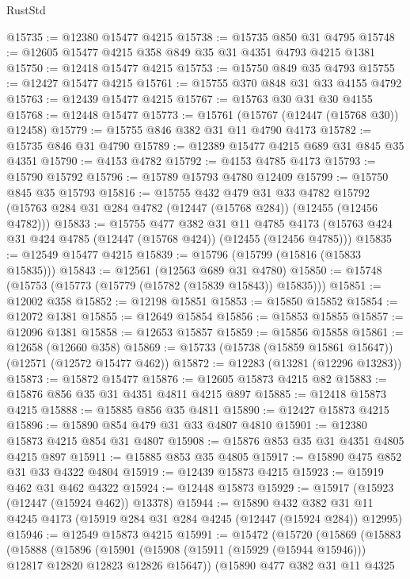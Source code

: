 \begin{lexlean}{RustStd}
\begin{coremodule}
@15735 := @12380 @15477 @4215
@15738 := @15735 @850 @31 @4795
@15748 := @12605 @15477 @4215 @358 @849 @35 @31 @4351 @4793 @4215 @1381
@15750 := @12418 @15477 @4215
@15753 := @15750 @849 @35 @4793
@15755 := @12427 @15477 @4215
@15761 := @15755 @370 @848 @31 @33 @4155 @4792
@15763 := @12439 @15477 @4215
@15767 := @15763 @30 @31 @30 @4155
@15768 := @12448 @15477
@15773 := @15761 (@15767 (@12447 (@15768 @30)) @12458)
@15779 := @15755 @846 @382 @31 @11 @4790 @4173
@15782 := @15735 @846 @31 @4790
@15789 := @12389 @15477 @4215 @689 @31 @845 @35 @4351
@15790 := @4153 @4782
@15792 := @4153 @4785 @4173
@15793 := @15790 @15792
@15796 := @15789 @15793 @4780 @12409
@15799 := @15750 @845 @35 @15793
@15816 := @15755
    @432
    @479
    @31
    @33
    @4782
    @15792
    (@15763 @284 @31 @284 @4782 (@12447 (@15768 @284)) (@12455 (@12456 @4782)))
@15833 := @15755
    @477
    @382
    @31
    @11
    @4785
    @4173
    (@15763 @424 @31 @424 @4785 (@12447 (@15768 @424)) (@12455 (@12456 @4785)))
@15835 := @12549 @15477 @4215
@15839 := @15796 (@15799 (@15816 (@15833 @15835)))
@15843 := @12561 (@12563 @689 @31 @4780)
@15850 := @15748 (@15753 (@15773 (@15779 (@15782 (@15839 @15843)) @15835)))
@15851 := @12002 @358
@15852 := @12198 @15851
@15853 := @15850 @15852
@15854 := @12072 @1381
@15855 := @12649 @15854
@15856 := @15853 @15855
@15857 := @12096 @1381
@15858 := @12653 @15857
@15859 := @15856 @15858
@15861 := @12658 (@12660 @358)
@15869 := @15733 (@15738 (@15859 @15861 @15647)) (@12571 (@12572 @15477 @462))
@15872 := @12283 (@13281 (@12296 @13283))
@15873 := @15872 @15477
@15876 := @12605 @15873 @4215 @82
@15883 := @15876 @856 @35 @31 @4351 @4811 @4215 @897
@15885 := @12418 @15873 @4215
@15888 := @15885 @856 @35 @4811
@15890 := @12427 @15873 @4215
@15896 := @15890 @854 @479 @31 @33 @4807 @4810
@15901 := @12380 @15873 @4215 @854 @31 @4807
@15908 := @15876 @853 @35 @31 @4351 @4805 @4215 @897
@15911 := @15885 @853 @35 @4805
@15917 := @15890 @475 @852 @31 @33 @4322 @4804
@15919 := @12439 @15873 @4215
@15923 := @15919 @462 @31 @462 @4322
@15924 := @12448 @15873
@15929 := @15917 (@15923 (@12447 (@15924 @462)) @13378)
@15944 := @15890
    @432
    @382
    @31
    @11
    @4245
    @4173
    (@15919 @284 @31 @284 @4245 (@12447 (@15924 @284)) @12995)
@15946 := @12549 @15873 @4215
@15991 := @15472
    (@15720
      (@15869
        (@15883
          (@15888
            (@15896
              (@15901 (@15908 (@15911 (@15929 (@15944 @15946))) @12817 @12820 @12823 @12826 @15647))
              (@15890
                @477
                @382
                @31
                @11
                @4325

\end{coremodule}
\end{lexlean}
